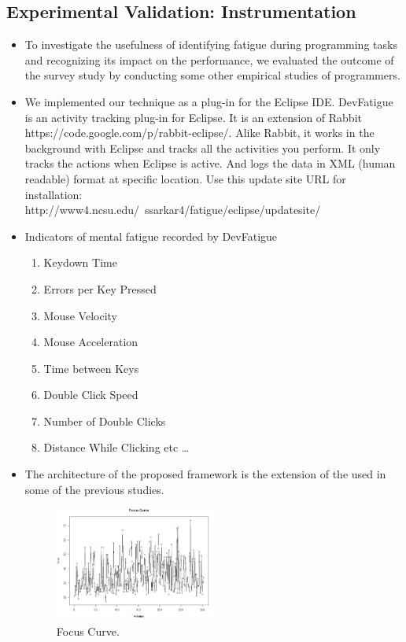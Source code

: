 \documentclass{acm_proc_article-sp}
\begin{document}
\subsection{Experimental Validation: Instrumentation}
\begin{itemize}
  \item To investigate the usefulness of identifying fatigue during programming
  tasks and recognizing its impact on the performance, we evaluated the
  outcome of the survey study by conducting some other empirical studies of
  programmers.
  \item We implemented our technique as a plug-in for the Eclipse IDE.
  DevFatigue is an activity tracking plug-in for Eclipse. It is an extension of
  Rabbit \\
  https://code.google.com/p/rabbit-eclipse/. Alike Rabbit, it works in
  the background with Eclipse and tracks all the activities you perform. It only
  tracks the actions when Eclipse is active. And logs the data in XML (human
  readable) format at specific location.
  Use this update site URL for installation: \\
  http://www4.ncsu.edu/~ssarkar4/fatigue/eclipse/updatesite/
  \item Indicators of mental fatigue recorded by DevFatigue
  	\begin{enumerate}
   		\item Keydown Time
   		\item Errors per Key Pressed
   		\item Mouse Velocity
   		\item Mouse Acceleration
   		\item Time between Keys
   		\item Double Click Speed
   		\item Number of Double Clicks
   		\item Distance While Clicking etc \ldots
    \end{enumerate}
  \item The architecture of the proposed framework is the extension of the used
  in some of the previous studies. \cite{pimenta:analysis}
  \cite{pimenta:monitor}
  \begin{figure}
	\centering
	\includegraphics[width=0.5\textwidth,natwidth=942,natheight=668]{focus.png}
	\caption{Focus Curve.}
  \end{figure}
\end{itemize}
\end{document}
